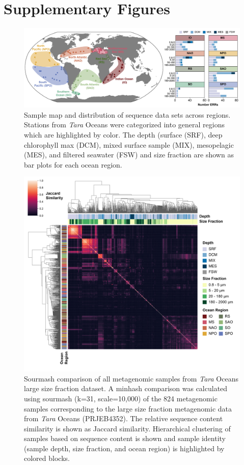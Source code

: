\documentclass[12pt]{article}
\numberwithin{equation}{section}
\begin{document}
\section*{Supplementary Figures}

\begin{landscape}
\begin{figure}
    \centering
    \includegraphics[width=0.95\columnwidth]{si-figures/Tara_stationMap-01.png}
    \caption{Sample map and distribution of sequence data sets across regions. Stations from \textit{Tara} Oceans were categorized into general regions which are highlighted by color. The depth (surface (SRF), deep chlorophyll max (DCM), mixed surface sample (MIX), mesopelagic (MES), and filtered seawater (FSW) and size fraction are shown as bar plots for each ocean region. }
    \label{fig:tara-map}
\end{figure}
\end{landscape}

\begin{figure}
    \centering
    \includegraphics[width=0.95\columnwidth]{si-figures/modified-sourmash-region-size_depth-01.png}
    \caption{Sourmash comparison of all metagenomic samples from \textit{Tara} Oceans large size fraction dataset. A minhash comparison was calculated using sourmash (k=31, scale=10,000) of the 824 metagenomic samples corresponding to the large size fraction metagenomic data from \textit{Tara} Oceans (PRJEB4352). The relative sequence content similarity is shown as Jaccard similarity. Hierarchical clustering of samples based on sequence content is shown and sample identity (sample depth, size fraction, and ocean region) is highlighted by colored blocks.}
    \label{fig:sourmash}
\end{figure}
\end{document}
